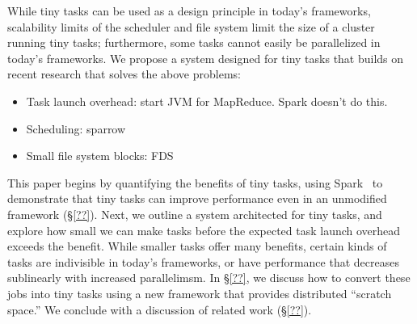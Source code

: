 While tiny tasks can be used as a design principle in today's frameworks,
scalability limits of the scheduler and file system limit the size of a
cluster running tiny tasks; furthermore, some tasks cannot easily be
parallelized in today's frameworks. 
We propose a system designed for tiny tasks that builds on recent research
that solves the above problems:
\begin{itemize}
\item Task launch overhead: start JVM for MapReduce. Spark doesn't do this.
\item Scheduling: sparrow
\item Small file system blocks: FDS
\end{itemize}

This paper begins by quantifying the benefits of tiny tasks,
using Spark~\cite{??} to demonstrate that tiny tasks can improve performance
even in an unmodified framework (\S\ref{??}).
Next, we outline a system architected for tiny tasks, and explore how small
we can make tasks before the expected task launch overhead exceeds the benefit.
While smaller tasks offer many benefits, certain kinds of tasks are indivisible
in today's frameworks, or have performance that decreases sublinearly with
increased parallelimsm. In \S\ref{??}, we discuss how to convert these jobs
into tiny tasks using a new framework that provides distributed ``scratch
space.''
We conclude with a discussion of related work (\S\ref{??}).

\begin{comment}
Today's datacenters run increasingly diverse workloads. A decade ago, compute
clusters were designed for batch workloads: a typical job took hours to complete.
As users migrated large amounts of data to these clusters, they demanded ever
faster access to this data, spurring low-latency frameworks (e.g., Dremel, Spark,
Shark, Impala) that stripe work across thousands of machines or store data in
memory in order to complete jobs in seconds. While data analysts and user-facing
services rely on these low-latency frameworks, clusters continue to run
long-running, batch jobs (e.g., indexing the web), leading to a diverse mix of
job runtimes.  Workload studies from Facebook, Microsoft, Yahoo!, and Google
corroborate this claim, finding that job completion times range from seconds to days.
\end{comment}
